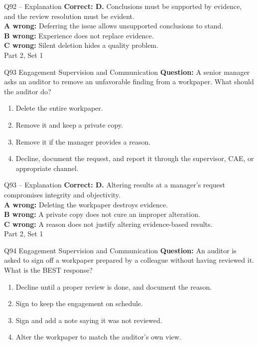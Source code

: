 \documentclass[aspectratio=169,10pt]{beamer}
\begin{document}
\begin{frame}[t]{Q92 -- Explanation}
	\footnotesize
	\textbf{Correct: D.} Conclusions must be supported by evidence, and the review resolution must be evident. \\[5pt]
\textbf{A wrong:} Deferring the issue allows unsupported conclusions to stand. \\[3pt]
\textbf{B wrong:} Experience does not replace evidence. \\[3pt]
\textbf{C wrong:} Silent deletion hides a quality problem. \\[3pt]
	\vfill {\tiny Part 2, Set 1}
\end{frame}
\begin{frame}[t]{Q93 \hfill {\scriptsize Engagement Supervision and Communication}}
	\small
	\textbf{Question:} A senior manager asks an auditor to remove an unfavorable finding from a workpaper. What should the auditor do?
	\begin{enumerate}[label=\Alph*.,itemsep=1pt,topsep=3pt]
			\item Delete the entire workpaper.
			\item Remove it and keep a private copy.
			\item Remove it if the manager provides a reason.
			\item Decline, document the request, and report it through the supervisor, CAE, or appropriate channel.
	\end{enumerate}
\end{frame}
\begin{frame}[t]{Q93 -- Explanation}
	\footnotesize
	\textbf{Correct: D.} Altering results at a manager's request compromises integrity and objectivity. \\[5pt]
\textbf{A wrong:} Deleting the workpaper destroys evidence. \\[3pt]
\textbf{B wrong:} A private copy does not cure an improper alteration. \\[3pt]
\textbf{C wrong:} A reason does not justify altering evidence-based results. \\[3pt]
	\vfill {\tiny Part 2, Set 1}
\end{frame}
\begin{frame}[t]{Q94 \hfill {\scriptsize Engagement Supervision and Communication}}
	\small
	\textbf{Question:} An auditor is asked to sign off a workpaper prepared by a colleague without having reviewed it. What is the BEST response?
	\begin{enumerate}[label=\Alph*.,itemsep=1pt,topsep=3pt]
			\item Decline until a proper review is done, and document the reason.
			\item Sign to keep the engagement on schedule.
			\item Sign and add a note saying it was not reviewed.
			\item Alter the workpaper to match the auditor's own view.
	\end{enumerate}
\end{frame}
\end{document}

